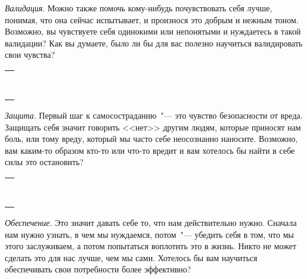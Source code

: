 \begin{itemize}
	\itemyinyang \textit{Валидация}. Можно также помочь кому-нибудь почувствовать себя лучше, понимая, что она сейчас испытывает, и произнося это добрым и нежным тоном. Возможно, вы чувствуете себя одинокими или непонятыми и нуждаетесь в такой валидации? Как вы думаете, было ли бы для вас полезно научиться валидировать свои чувства?
\end{itemize}

\setlength{\extrarowheight}{2mm}
\begin{tabularx}{\textwidth}{X}
	\\
	\arrayrulecolor{gray}\hline\\
	\hline\\
	\hline\\
	\hline\\
	\hline\\
	\hline\\
	\hline\\
	\hline\\
	\hline\\
\end{tabularx}
\setlength{\extrarowheight}{0mm}


\begin{itemize}
	\itemyinyang \textit{Защита}. Первый шаг к самосостраданию~"--- это чувство безопасности от вреда. Защищать себя значит говорить <<нет>> другим людям, которые приносят нам боль, или тому вреду, который мы часто себе неосознанно наносите. Возможно, вам каким-то образом кто-то или что-то вредит и вам хотелось бы найти в себе силы это остановить? 
\end{itemize}

\setlength{\extrarowheight}{2mm}
\begin{tabularx}{\textwidth}{X}
	\\
	\arrayrulecolor{gray}\hline\\
	\hline\\
	\hline\\
	\hline\\
	\hline\\
	\hline\\
	\hline\\
	\hline\\
	\hline\\
\end{tabularx}
\setlength{\extrarowheight}{0mm}

\begin{itemize}
	\itemyinyang \textit{Обеспечение}. Это значит давать себе то, что нам действительно нужно. Сначала нам нужно узнать, в чем мы нуждаемся, потом~"--- убедить себя в том, что мы этого заслуживаем, а потом попытаться воплотить это в жизнь. Никто не может сделать это для нас лучше, чем мы сами. Хотелось бы вам научиться обеспечивать свои потребности более эффективно?
\end{itemize}

